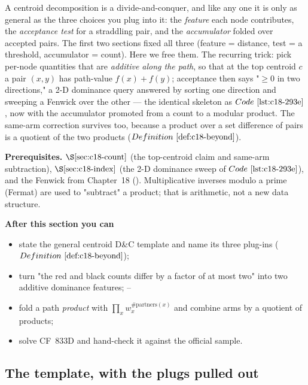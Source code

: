 \begin{topicintro}
A centroid decomposition is a divide-and-conquer, and like any one it is only as
general as the three choices you plug into it: the \emph{feature} each node contributes,
the \emph{acceptance test} for a straddling pair, and the \emph{accumulator} folded over
accepted pairs. The first two sections fixed all three (feature = distance, test = a
threshold, accumulator = count). Here we free them. The recurring trick: pick per-node
quantities that are \emph{additive along the path}, so that at the top centroid \(c\) a
pair \((x,y)\) has path-value \(f(x)+f(y)\); acceptance then says "\(\ge 0\) in two
directions," a 2-D dominance query answered by sorting one direction and sweeping a
Fenwick over the other --- the identical skeleton as \(\coderef{c18-293e}\), now with the
accumulator promoted from a count to a modular product. The same-arm correction survives
too, because a product over a set difference of pairs is a quotient of the two products
(\(\defref{c18-beyond}\)).

\textbf{Prerequisites.} \(\secref{c18-count}\) (the top-centroid claim and same-arm
subtraction), \(\secref{c18-index}\) (the 2-D dominance sweep of \(\coderef{c18-293e}\)),
and the Fenwick from Chapter~18 (). Multiplicative inverses modulo a prime
(Fermat) are used to "subtract" a product; that is arithmetic, not a new data structure.

\textbf{After this section you can}
\begin{itemize}[nosep]
  \item state the general centroid D\&C template and name its three plug-ins (\(\defref{c18-beyond}\)); \hfill{}
  \item turn "the red and black counts differ by a factor of at most two" into two additive
        dominance features; \hfill{}--
  \item fold a path \emph{product} with \(\prod_x w_x^{\#\text{partners}(x)}\) and combine arms by
        a quotient of products; \hfill{}
  \item solve CF~833D and hand-check it against the official sample. \hfill{}
\end{itemize}
\end{topicintro}

\subsection{The template, with the plugs pulled out}

